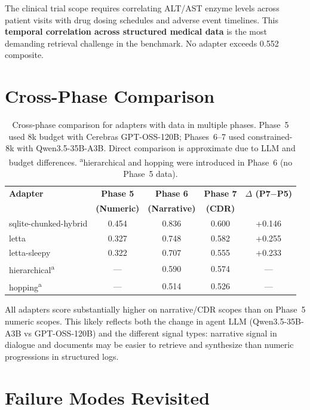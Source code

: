 \documentclass[11pt,letterpaper]{article}
\begin{document}
The clinical trial scope requires correlating ALT/AST enzyme levels across patient visits with drug dosing schedules and adverse event timelines. This \textbf{temporal correlation across structured medical data} is the most demanding retrieval challenge in the benchmark. No adapter exceeds 0.552 composite.

\section{Cross-Phase Comparison}
\label{sec:cross-phase}

\begin{table}[H]
\centering
\small
\begin{tabular}{lcccc}
\toprule
\textbf{Adapter} & \textbf{Phase 5} & \textbf{Phase 6} & \textbf{Phase 7} & \textbf{$\Delta$ (P7$-$P5)} \\
& \textbf{(Numeric)} & \textbf{(Narrative)} & \textbf{(CDR)} & \\
\midrule
sqlite-chunked-hybrid & 0.454 & 0.836 & 0.600 & +0.146 \\
letta & 0.327 & 0.748 & 0.582 & +0.255 \\
letta-sleepy & 0.322 & 0.707 & 0.555 & +0.233 \\
hierarchical\textsuperscript{a} & --- & 0.590 & 0.574 & --- \\
hopping\textsuperscript{a} & --- & 0.514 & 0.526 & --- \\
\bottomrule
\end{tabular}
\caption{Cross-phase comparison for adapters with data in multiple phases. Phase~5 used 8k budget with Cerebras GPT-OSS-120B; Phases~6--7 used constrained-8k with Qwen3.5-35B-A3B. Direct comparison is approximate due to LLM and budget differences. \textsuperscript{a}hierarchical and hopping were introduced in Phase~6 (no Phase~5 data).}
\label{tab:cross-phase}
\end{table}

All adapters score substantially higher on narrative/CDR scopes than on Phase~5 numeric scopes. This likely reflects both the change in agent LLM (Qwen3.5-35B-A3B vs GPT-OSS-120B) and the different signal types: narrative signal in dialogue and documents may be easier to retrieve and synthesize than numeric progressions in structured logs.

\section{Failure Modes Revisited}
\label{sec:failures}
\end{document}
